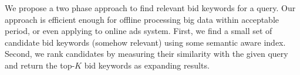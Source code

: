 We propose a two phase approach to find relevant bid
keywords for a query.  Our approach is efficient enough for offline processing
big data within acceptable period, or even applying to online ads system.
First, we find a small set of candidate bid keywords (somehow relevant) using some
semantic aware index.  Second, we rank candidates by measuring their
similarity with the given query and return the top-$K$ bid keywords as
expanding results.
%
%
%
